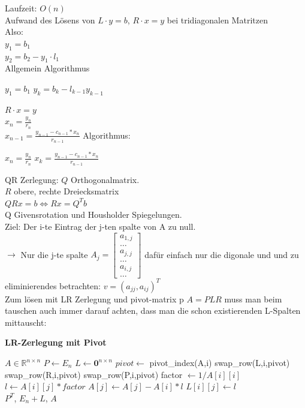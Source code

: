 \documentclass{article}
\begin{document}
	Laufzeit: $O(n)$\\
	Aufwand des Lösens von $L\cdot y = b$, $R\cdot x = y$ bei tridiagonalen Matritzen\\
	Also:\\
	$y_1 = b_1$\\
	$y_2 = b_2-y_1\cdot l_1$\\
	Allgemein Algorithmus\\
	\begin{algorithmic}
	\State $y_1 = b_1$
	\State $y_k =b_k-l_{k-1}y_{k-1}$
	\EndFor
	\end{algorithmic}
	$R\cdot x=y$\\
	$x_n = \frac{y_n}{r_n}$\\
	$x_{n-1} = \frac{y_{n-1}-c_{n-1}*x_{n}}{r_{n-1}}$
	Algorithmus:\\
	\begin{algorithmic}
	\State $x_n = \frac{y_n}{r_n}$
	\For {$k=n-1, \dots,1$}
	\State $x_k =\frac{y_{n-1}-c_{n-1}*x_{n}}{r_{n-1}}$
	\EndFor
	\end{algorithmic}
	QR Zerlegung: $Q$ Orthogonalmatrix.\\
	$R$ obere, rechte Dreiecksmatrix\\
	$QRx=b\iff Rx=Q^T b$\\
	Q Givensrotation und Housholder Spiegelungen.\\
	Ziel: Der i-te Eintrag der j-ten spalte von A zu null.\\
	$\to$ Nur die j-te spalte $A_j=\begin{bmatrix}a_{1,j}\\\hdots\\a_{j,j}\\\hdots\\a_{i,j}\\\hdots\end{bmatrix}$
	dafür einfach nur die digonale und und zu eliminierendes betrachten: $v=(a_{jj},a_{ij})^T$\\
	Zum lösen mit LR Zerlegung und pivot-matrix p $A=PLR$ muss man beim tauschen auch immer darauf achten, dass man die schon existierenden L-Spalten mittauscht:\\
	\begin{algorithm}
	\textbf{LR-Zerlegung mit Pivot}
	\begin{algorithmic}
	\Require $A\in\mathbb{R}^{n\times n}$
	\State $P\gets E_n$
	\State $L\gets\textbf{0}^{n\times n}$
	\For{$i\in[0..n]$}
		\State $pivot\gets$ pivot\_index(A,i)
		\State swap\_row(L,i,pivot)
		\State swap\_row(R,i,pivot)
		\State swap\_row(P,i,pivot)
		\State factor $\gets 1/A[i][i]$
		\For{$j\in[i..n]$}
			\State $l\gets A[i][j]*factor$
			\State $A[j]\gets A[j]-A[i]*l$
			\State $L[i][j]\gets l$
		\EndFor
	\EndFor\\
	\Return $P^T$, $E_n+L$, $A$ 
	\end{algorithmic}
	\end{algorithm}
\end{document}
